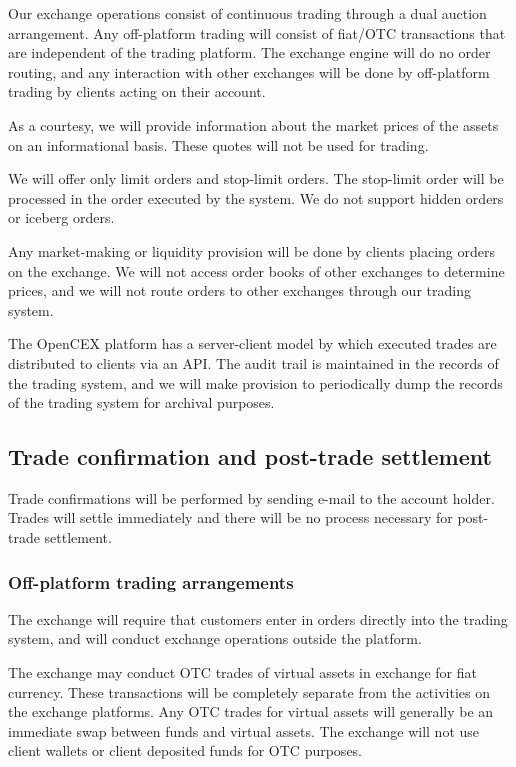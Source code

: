 Our exchange operations consist of continuous trading through a dual
auction arrangement.  Any off-platform trading will consist of
fiat/OTC transactions that are independent of the trading platform.
The exchange engine will do no order routing, and any interaction with
other exchanges will be done by off-platform trading by clients acting
on their account.

As a courtesy, we will provide information about the market prices of
the assets on an informational basis.  These quotes will not be used
for trading.

We will offer only limit orders and stop-limit orders.  The stop-limit
order will be processed in the order executed by the system.  We do
not support hidden orders or iceberg orders.

Any market-making or liquidity provision will be done by clients
placing orders on the exchange.  We will not access order books of
other exchanges to determine prices, and we will not route orders to
other exchanges through our trading system.

The OpenCEX platform has a server-client model by which executed
trades are distributed to clients via an API.  The audit trail is
maintained in the records of the trading system, and we will make
provision to periodically dump the records of the trading system for
archival purposes.


\subsection{Trade confirmation and post-trade settlement}

Trade confirmations will be performed by sending e-mail to the account
holder.  Trades will settle immediately and there will be no
process necessary for post-trade settlement.

\subsubsection{Off-platform trading arrangements}
The exchange will require that customers enter in orders directly into
the trading system, and will conduct exchange operations outside
the platform.

The exchange may conduct OTC trades of virtual assets in exchange for
fiat currency.  These transactions will be completely separate from
the activities on the exchange platforms.  Any OTC trades for virtual
assets will generally be an immediate swap between funds
and virtual assets.  The exchange will not use client wallets or
client deposited funds for OTC purposes.

